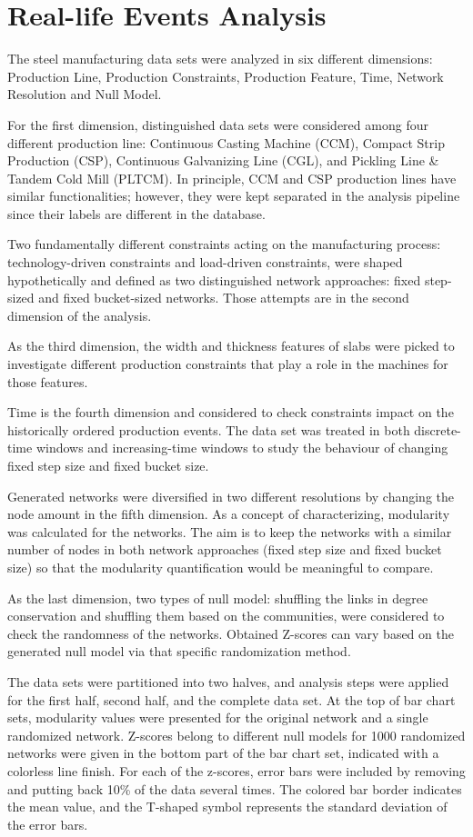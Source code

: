 \section{Real-life Events Analysis}
{\color{red} 
The steel manufacturing data sets were analyzed in six different dimensions: Production Line, Production Constraints, Production Feature, Time, Network Resolution and Null Model.

For the first dimension, distinguished data sets were considered among four different production line: Continuous Casting Machine (CCM), Compact Strip Production (CSP), Continuous Galvanizing Line (CGL), and Pickling Line \& Tandem Cold Mill (PLTCM). In principle, CCM and CSP production lines have similar functionalities; however, they were kept separated in the analysis pipeline since their labels are different in the database. 

Two fundamentally different constraints acting on the manufacturing process: technology-driven constraints and load-driven constraints, were shaped hypothetically and defined as two distinguished network approaches: fixed step-sized and fixed bucket-sized networks. Those attempts are in the second dimension of the analysis. 

As the third dimension, the width and thickness features of slabs were picked to investigate different production constraints that play a role in the machines for those features. 

Time is the fourth dimension and considered to check constraints impact on the historically ordered production events. The data set was treated in both discrete-time windows and increasing-time windows to study the behaviour of changing fixed step size and fixed bucket size. 

Generated networks were diversified in two different resolutions by changing the node amount in the fifth dimension. As a concept of characterizing, modularity was calculated for the networks. The aim is to keep the networks with a similar number of nodes in both network approaches (fixed step size and fixed bucket size) so that the modularity quantification would be meaningful to compare. 

As the last dimension, two types of null model: shuffling the links in degree conservation and shuffling them based on the communities, were considered to check the randomness of the networks. Obtained Z-scores can vary based on the generated null model via that specific randomization method.

The data sets were partitioned into two halves, and analysis steps were applied for the first half, second half, and the complete data set. At the top of bar chart sets, modularity values were presented for the original network and a single randomized network. Z-scores belong to different null models for 1000 randomized networks were given in the bottom part of the bar chart set, indicated with a colorless line finish. For each of the z-scores, error bars were included by removing and putting back 10\% of the data several times. The colored bar border indicates the mean value, and the T-shaped symbol represents the standard deviation of the error bars.
}




